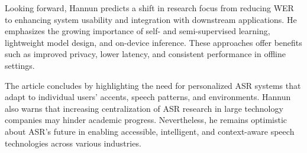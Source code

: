 Looking forward, Hannun predicts a shift in research focus from reducing WER to enhancing system usability and integration with downstream applications. He emphasizes the growing importance of self- and semi-supervised learning, lightweight model design, and on-device inference. These approaches offer benefits such as improved privacy, lower latency, and consistent performance in offline settings.

The article concludes by highlighting the need for personalized ASR systems that adapt to individual users’ accents, speech patterns, and environments. Hannun also warns that increasing centralization of ASR research in large technology companies may hinder academic progress. Nevertheless, he remains optimistic about ASR's future in enabling accessible, intelligent, and context-aware speech technologies across various industries.


